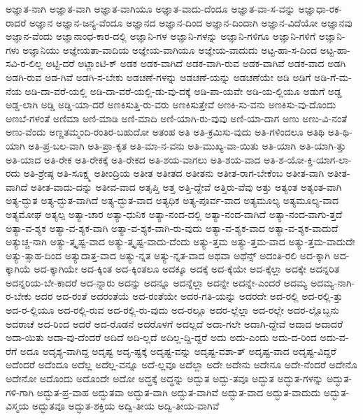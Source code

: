 {ಅಜ್ಞಾತ-ನಾಗಿ
ಅಜ್ಞಾತ-ವಾಗಿ
ಅಜ್ಞಾತ-ವಾಗಿಯೂ
ಅಜ್ಞಾತ-ವಾದು-ದೆಂದೂ
ಅಜ್ಞಾತ-ವಾ-ಸ-ವನ್ನು
ಅಜ್ಞಾಧಾ-ರಕ-ರಾದರೆ
ಅಜ್ಞಾನ
ಅಜ್ಞಾನ-ಜನ್ಯ-ವೆಂದೂ
ಅಜ್ಞಾನದ
ಅಜ್ಞಾನ-ದಿಂದ
ಅಜ್ಞಾನ-ದಿಂದಾಗಿ
ಅಜ್ಞಾನ-ವಿದೆಯೋ
ಅಜ್ಞಾನವು
ಅಜ್ಞಾನ-ವೆಂದು
ಅಜ್ಞಾನಾಂಧ-ಕಾರ-ದಲ್ಲಿ
ಅಜ್ಞಾನಿ-ಗಳ
ಅಜ್ಞಾನಿ-ಗಳನ್ನು
ಅಜ್ಞಾನಿ-ಗಳಿಗೂ
ಅಜ್ಞಾನಿ-ಗಳಿಗೆ
ಅಜ್ಞಾನಿ-ಗಳು
ಅಜ್ಞಾನಿಯು
ಅಜ್ಞೇಯತಾ-ವಾದಿಯ
ಅಜ್ಞೇಯ-ವಾಗಿಯೂ
ಅಜ್ಞೇಯ-ವಾದುದು
ಅಟ್ಟ-ಹಾ-ಸ-ದಿಂದ
ಅಟ್ಟ-ಹಾ-ಸವಿ-ರ-ಲಿಲ್ಲ
ಅಟ್ಟಿ-ದರೆ
ಅಟ್ಲಾಂಟಿ-ಕ್
ಅಡಕ
ಅಡಕ-ವಾಗಿದೆ
ಅಡಕ-ವಾಗಿ-ರುವ
ಅಡಕ-ವಾಗಿವೆ
ಅಡಕ-ವಾದ
ಅಡಗಿ
ಅಡಗಿ-ರುವ
ಅಡ-ಗಿವೆ
ಅಡಗಿ-ಸ-ಬೇಕು
ಅಡಚಣೆ-ಗಳನ್ನು
ಅಡಚಣೆ-ಯನ್ನು
ಅಡಚಣೆಯೇ
ಅಡಿ
ಅಡಿಗೆ
ಅಡಿ-ಗೆ-ಮ-ನೆಯ
ಅಡಿ-ದಾ-ವರೆ-ಯಲ್ಲಿ
ಅಡಿ-ದಾ-ವರೆ-ಯಲ್ಲಿ-ಡು-ವು-ದಕ್ಕೆ
ಅಡಿ-ಪಾ-ಯವೇ
ಅಡಿ-ಯ-ಲ್ಲಿಯೂ
ಅಡುಗೆ
ಅಡ್ಡ
ಅಡ್ಡ-ಲಾಗಿ
ಅಡ್ಡಿ
ಅಡ್ಡಿ-ಯಾ-ದರೆ
ಅಣಕಿಸುತ್ತಿ-ರು-ವರು
ಅಣಕಿಸುತ್ತೇವೆ
ಅಣಕಿ-ಸು-ವನು
ಅಣಕಿಸು-ವು-ದೊಂದು
ಅಣಬೆ-ಗಳಂತೆ
ಅಣಿಮಾ
ಅಣಿ-ಮಾಡಿ
ಅಣಿ-ಮಾದಿ
ಅಣಿ-ಯಾಗಿ-ರು-ವುವು
ಅಣಿ-ಯಾ-ದಾಗ
ಅಣು
ಅಣು-ವಿ-ನಂತೆ
ಅಣು-ವೆಂದು
ಅಣ್ಣತಮ್ಮಂದಿ-ರಂತಿರ-ಬಹುದೋ
ಅತಂಹ
ಅತಿ
ಅತಿ-ಕ್ರಮಿಸು-ವುದು
ಅತಿ-ಗಳಿಂದಲೂ
ಅತಿಥಿ
ಅತಿ-ಥಿ-ಯಾಗಿ
ಅತಿ-ಪ್ರ-ಬಲ-ವಾಗಿ
ಅತಿ-ಪ್ರಾ-ಕೃತ
ಅತಿ-ಮಾ-ನ-ವನು
ಅತಿ-ಮುಖ್ಯ-ವಾ-ಯಿತು
ಅತಿ-ಯಾಗಿ
ಅತಿ-ಯಾಗಿ-ತ್ತು
ಅತಿ-ಯಾದ
ಅತಿ-ರೇಕ
ಅತಿ-ರೇಕಕ್ಕೆ
ಅತಿ-ರೇಕದ
ಅತಿ-ಶಯ-ವಾಗಲು
ಅತಿ-ಶಯ-ವಾದ
ಅತಿ-ಶ-ಯೋ-ಕ್ತಿ-ಯಾಗ-ಲಾ-ರದು
ಅತಿ-ಶ್ರೇಷ್ಠ
ಅತಿ-ಸೂಕ್ಷ್ಮ
ಅತೀಂದ್ರಿಯ
ಅತೀತ
ಅತೀತದ
ಅತೀತನು
ಅತೀತ-ರಾಗ-ಬೇಕೆಂಬ
ಅತೀತ-ವಾಗಿ
ಅತೀತ-ವಾಗಿದೆ
ಅತೀತ-ವಾದು-ದನ್ನು
ಅತೀವ-ವಾದ
ಅತೃಪ್ತಿ
ಅತ್ತ
ಅತ್ತಿ-ದ್ದೇವೆ
ಅತ್ತಿರು-ವೆವು
ಅತ್ತು
ಅತ್ಯಂತ
ಅತ್ಯಂತ-ವಾಗಿ
ಅತ್ಯ-ದ್ಭುತ
ಅತ್ಯ-ದ್ಭುತ-ವಾಗಿದೆ
ಅತ್ಯ-ದ್ಭುತ-ವಾದ
ಅತ್ಯಧಿಕ
ಅತ್ಯ-ಪೂರ್ವ-ವಾದ
ಅತ್ಯಮೂಲ್ಯ
ಅತ್ಯಮೂಲ್ಯ-ವಾದ
ಅತ್ಯಮೋಘ
ಅತ್ಯಲ್ಪ
ಅತ್ಯಾ-ಚಾರ
ಅತ್ಯಾ-ಧುನಿಕ
ಅತ್ಯಾ-ನಂದ-ದಲ್ಲಿ
ಅತ್ಯಾ-ನಂದ-ವಾಗಿದೆ
ಅತ್ಯಾ-ನಂದ-ವಾಗು-ತ್ತದೆ
ಅತ್ಯಾ-ವ-ಶ್ಯಕ
ಅತ್ಯಾ-ವ-ಶ್ಯಕ-ವಾಗಿ
ಅತ್ಯಾ-ವ-ಶ್ಯಕ-ವಾಗಿ-ರು-ವುದು
ಅತ್ಯಾ-ವ-ಶ್ಯಕ-ವಾದ
ಅತ್ಯಾ-ವ-ಶ್ಯಕ-ವಾದುದೆ
ಅತ್ಯುಚ್ಚ-ನಾಗಿ
ಅತ್ಯು-ತ್ಕೃಷ್ಟ-ವಾದ
ಅತ್ಯು-ತ್ಕೃಷ್ಟ-ವಾದು-ದೆಂದು
ಅತ್ಯು-ತ್ತಮ
ಅತ್ಯು-ತ್ತಮ-ವಾದ
ಅತ್ಯು-ತ್ತಮ-ವಾದುದೇ
ಅತ್ಯು-ತ್ಸಾಹ-ದಿಂದ
ಅತ್ಯುದಾತ್ತ-ವಾದ
ಅತ್ಯು-ನ್ನತ
ಅತ್ಯು-ನ್ನತ-ವಾದ
ಅಥವಾ
ಅಥೆನ್ಸ್
ಅದಂತಿ-ರಲಿ
ಅದ-ಕ್ಕಾಗಿ
ಅದ-ಕ್ಕಾಗಿಯೆ
ಅದ-ಕ್ಕಾಗಿಯೇ
ಅದ-ಕ್ಕಿಂತ
ಅದ-ಕ್ಕಿಂತಲೂ
ಅದಕ್ಕೂ
ಅದಕ್ಕೆ
ಅದ-ಕ್ಕೆಯೇ
ಅದ-ಕ್ಕೆಲ್ಲಾ
ಅದಕ್ಕೇ
ಅದನ್ನರಿತ
ಅದನ್ನರಿಯ-ಬೇ-ಕಾದರೆ
ಅದ-ನ್ನಾರು
ಅದನ್ನು
ಅದನ್ನೂ
ಅದನ್ನೆಲ್ಲಾ
ಅದನ್ನೇ
ಅದನ್ನೇ-ಎಂದರೆ
ಅದಮ್ಯ
ಅದಮ್ಯ-ನಾಗಿ-ರ-ಬೇಕು
ಅದರ
ಅದ-ರಂತೆ
ಅದರಂತೆಯೆ
ಅದ-ರಂತೆಯೇ
ಅದರ-ಗತಿ-ಯನ್ನು
ಅದರದೇ
ಅದ-ರಲ್ಲಿ
ಅದ-ರಲ್ಲಿ-ತ್ತು
ಅದ-ರ-ಲ್ಲಿಯೂ
ಅದ-ರಲ್ಲಿ-ರುವ
ಅದ-ರಲ್ಲಿ-ರು-ವುದು
ಅದ-ರಲ್ಲೂ
ಅದರ-ಲ್ಲೆಲ್ಲಾ
ಅದ-ರಲ್ಲೇ
ಅದರ-ಲ್ಲೊಬ್ಬನು
ಅದರಾಚೆ
ಅದ-ರಿಂದ
ಅದರೆ
ಅದ-ರೊಡನೆ
ಅದರೊಳಗೆ
ಅದಲ್ಲದೆ
ಅದಾ-ಗಲೇ
ಅದಾಗಿ-ದ್ದೇವೆ
ಅದಾದ
ಅದಾದರೆ
ಅದಾ-ಯಿತು
ಅದಾ-ವು-ದೆಂದರೆ
ಅದಿದೆ
ಅದಿ-ಲ್ಲದೆ
ಅದಿಲ್ಲ-ದ್ದಿ-ದ್ದರೆ
ಅದು
ಅದು-ಎಂದು
ಅದು-ದ-ರಿಂದ
ಅದು-ವ-ರೆಗೆ
ಅದೂ
ಅದೃಶ್ಯ-ವಾಗಿದ್ದ
ಅದೃಷ್ಟ
ಅದೃ-ಷ್ಟಕ್ಕೆ
ಅದೃಷ್ಟ-ವನ್ನು
ಅದೃಷ್ಟ-ವಶಾ-ತ್
ಅದೃಷ್ಟ-ವಾದ
ಅದೃಷ್ಟ-ವಿದ್ದರೆ
ಅದೆಂದರೆ
ಅದೆಂದೂ
ಅದೆಲ್ಲ
ಅದೆಲ್ಲ-ವನ್ನೂ
ಅದೆ-ಲ್ಲವೂ
ಅದೆಲ್ಲಾ
ಅದೇ
ಅದೇನು
ಅದೇನೂ
ಅದೇ-ನೆಂದರೆ
ಅದೇನೊ
ಅದೇನೋ
ಅದೊಂದು
ಅದೊಂದೇ
ಅದೋ
ಅದ್ಧಕ್ಕೆ
ಅದ್ಧನ್ನು
ಅದ್ಬುತ
ಅದ್ಬು-ತವೂ
ಅದ್ಭುತ
ಅದ್ಭುತ-ಗಳನ್ನು
ಅದ್ಭುತ-ಗಳಿ-ಗಾಗಿ
ಅದ್ಭುತ-ಪ್ರ-ವಾಹ
ಅದ್ಭುತವಾ
ಅದ್ಭುತ-ವಾಗಿ
ಅದ್ಭುತ-ವಾಗಿವೆ
ಅದ್ಭುತ-ವಾದ
ಅದ್ಭುತ-ವಾದುದು
ಅದ್ಭುತ-ವಿಸ್ಮಯ
ಅದ್ಭುತವೂ
ಅದ್ಭುತ-ಶಕ್ತಿಯ
ಅದ್ವಿ-ತೀಯ
ಅದ್ವಿ-ತೀಯ-ವಾಗಿವೆ
}
